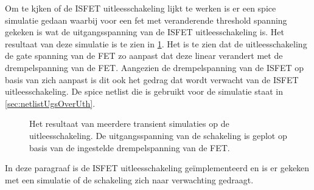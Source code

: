 
Om te kjken of de ISFET uitleesschakeling lijkt te werken is er een spice simulatie gedaan waarbij voor een fet met veranderende threshold spanning gekeken is wat de uitgangsspanning van de ISFET uitleesschakeling is. Het resultaat van deze simulatie is te zien in \cref{fig:readoutSimTrans}. Het is te zien dat de uitleesschakeling de gate spanning van de FET zo aanpast dat deze linear verandert met de drempelspanning van de FET. Aangezien de drempelspanning van de ISFET op basis van \si{\pH} zich aanpast is dit ook het gedrag dat wordt verwacht van de ISFET uitleesschakeling. De spice netlist die is gebruikt voor de simulatie staat in \cref{sec:netlistUgsOverUth}.
\begin{figure}[!htb]
    \centering
    \pgfplotsset{width=0.7\textwidth}
    
    \caption{Het resultaat van meerdere transient simulaties op de uitleesschakeling. De uitgangsspanning van de schakeling is geplot op basis van de ingestelde drempelspanning van de FET.}
    \label{fig:readoutSimTrans}
\end{figure}

In deze paragraaf is de ISFET uitleesschakeling geïmplementeerd en is er gekeken met een simulatie of de schakeling zich naar verwachting gedraagt.